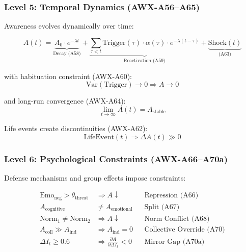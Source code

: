 \subsubsection{Level 5: Temporal Dynamics (AWX-A56--A65)}

Awareness evolves dynamically over time:

\begin{equation}
A(t) = \underbrace{A_0 \cdot e^{-\lambda t}}_{\text{Decay (A58)}} + \underbrace{\sum_{\tau < t} \text{Trigger}(\tau) \cdot \alpha(\tau) \cdot e^{-\lambda(t-\tau)}}_{\text{Reactivation (A59)}} + \underbrace{\text{Shock}(t)}_{\text{(A63)}}
\label{eq:temporal}
\end{equation}

with habituation constraint (AWX-A60):
\begin{equation}
\text{Var}(\text{Trigger}) \to 0 \Rightarrow A \to 0
\end{equation}

and long-run convergence (AWX-A64):
\begin{equation}
\lim_{t \to \infty} A(t) = A_{\text{stable}}
\end{equation}

Life events create discontinuities (AWX-A62):
\begin{equation}
\text{LifeEvent}(t) \Rightarrow \Delta A(t) \gg 0
\end{equation}

\subsubsection{Level 6: Psychological Constraints (AWX-A66--A70a)}

Defense mechanisms and group effects impose constraints:

\begin{align}
\text{Emo}_{\text{neg}} > \theta_{\text{threat}} &\Rightarrow A \downarrow && \text{Repression (A66)} \\
A_{\text{cognitive}} &\neq A_{\text{emotional}} && \text{Split (A67)} \\
\text{Norm}_1 \neq \text{Norm}_2 &\Rightarrow A \downarrow && \text{Norm Conflict (A68)} \\
A_{\text{coll}} \gg A_{\text{ind}} &\Rightarrow A_{\text{ind}} = 0 && \text{Collective Override (A70)} \\
\Delta I_t \geq 0.6 &\Rightarrow \frac{\partial A}{\partial \Delta I_t} < 0 && \text{Mirror Gap (A70a)}
\end{align}

